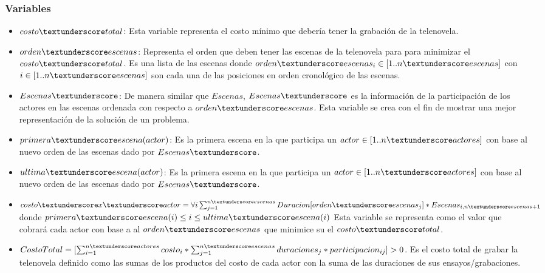 \documentclass{article}
\begin{document}
 \subsubsection{Variables}
\begin{itemize}
    \item $costo\textunderscore total$: Esta variable representa el costo mínimo que debería tener la grabación de la telenovela.
    \item $orden\textunderscore escenas$: Representa el orden que deben tener las escenas de la telenovela para para minimizar el $costo\textunderscore total$. Es una lista de las escenas donde $orden\textunderscore escenas_i \in [1..n\textunderscore escenas]$ con $i \in [1..n\textunderscore escenas]$ son cada una de las posiciones en orden cronológico de las escenas.
    \item $Escenas\textunderscore$: De manera similar que $Escenas$, $Escenas\textunderscore$ es la información de la participación de los actores en las escenas ordenada con respecto a $orden\textunderscore escenas$. Esta variable se crea con el fin de mostrar una mejor representación de la solución de un problema.
    \item $primera\textunderscore escena(actor)$: Es la primera escena en la que participa un $actor \in [1..n\textunderscore actores]$ con base al nuevo orden de las escenas dado por $Escenas\textunderscore$.
    \item $ultima\textunderscore escena(actor)$: Es la primera escena en la que participa un $actor \in [1..n\textunderscore actores]$ con base al nuevo orden de las escenas dado por $Escenas\textunderscore$.
    \item $costo\textunderscore x\textunderscore actor = \forall i\sum_{j=1}^{n\textunderscore escenas} Duracion[orden\textunderscore escenas_j] * Escenas_{i,n\textunderscore escenas+1}$\newline
    donde $primera\textunderscore escena(i) \leq i \leq ultima\textunderscore escena(i)$\newline
    Esta variable se representa como el valor que cobrará cada actor con base a al $orden\textunderscore escenas$ que minimice su el $costo\textunderscore total$. 
    

    
    \item $CostoTotal = [\sum_{i=1}^{n\textunderscore actores} costo_i * \sum_{j=1}^{n\textunderscore escenas}duraciones_j * participacion_{ij} ]   > 0$. \newline\newline
          Es el costo total de grabar la telenovela definido como las sumas de los productos del costo de cada actor con la suma de las duraciones de sus ensayos/grabaciones.
\end{itemize}
\end{document}
